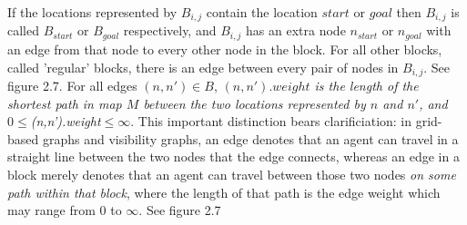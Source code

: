 \documentclass[12pt,notitlepage]{report}
\begin{document}
\noindent
If the locations represented by $B_{i,j}$ contain the location $start$ or $goal$ then $B_{i,j}$ is called $B_{start}$ or $B_{goal}$ respectively, and $B_{i,j}$ has an extra node $n_{start}$ or $n_{goal}$ with an edge from that node to every other node in the block. For all other blocks, called 'regular' blocks, there is an edge between every pair of nodes in $B_{i,j}$. See figure 2.7. For all edges $(n,n') \in B$, {\em $(n,n').weight$ is the length of the shortest path in map $M$ between the two locations represented by $n$ and $n'$, and $0 \leq $(n,n').weight$ \leq \infty$}. This important distinction bears clarificiation: in grid-based graphs and visibility graphs, an edge denotes that an agent can travel in a straight line between the two nodes that the edge connects, whereas an edge in a block merely denotes that an agent can travel between those two nodes {\em on some path within that block}, where the length of that path is the edge weight which may range from $0$ to $\infty$. See figure 2.7\\
\end{document}
